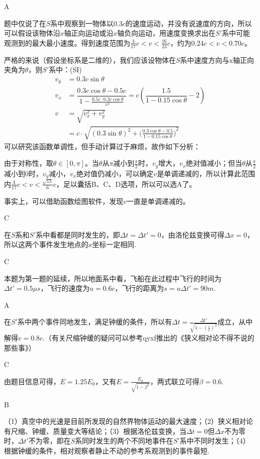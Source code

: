 \documentclass[b5paper,opensource,sourcefont,parskip]{qyxf-book}
\begin{document}
A

\solve
题中仅说了在$S$系中观察到一物体以$0.3c$的速度运动，并没有说速度的方向，所以可以假设该物体沿$x$轴正向运动或沿$x$轴负向运动，用速度变换求出在$S'$系中可能观测到的最大最小速度。得到速度范围为$\frac{4}{17}c<v<\frac{16}{23}c$，约为$0.24c<v<0.70c$。

严格的来说（假设坐标系是二维的），我们应该设物体在$S$系中速度方向与x轴正向夹角为$\theta$，则$S'$系中：(SI)
\begin{align*}
v_y&=0.3c\sin\theta\\
v_x&=\dfrac{0.3c\cos\theta-0.5c}{1-\frac{0.5c\cdot 0.3c\cos\theta}{c^2}}=c(\dfrac{1.5}{1-0.15\cos\theta}-2)\\
v&=\sqrt{v_x^2+v_y^2}\\
&=c\cdot \sqrt{(0.3\sin\theta)^2+{\big(\frac{0.3\cos\theta-0.5}{1-0.15\cos\theta}\big)}^2}
\end{align*}
可以研究该函数单调性，但手动计算过于麻烦，故作如下分析：

由于对称性，取$\theta\in[0,\pi]$。当$\theta$从$\pi$减小到$\frac{\pi}{2}$时，$v_y$增大，$v_x$绝对值减小；但当$\theta$从$\frac{\pi}{2}$减小到$0$时，$v_y$减小，$v_x$绝对值仍减小，可以确定$v$是单调递减的，所以计算此范围内$\frac{4}{17}c<v<\frac{\sqrt{13}}{6}c$，足以囊括B、C、D选项，所以可以选A了。

事实上，可以借助函数绘图软件，发现$v$一直是单调递减的。

C

\solve
在$S$系和$S'$系中看都是同时发生的，即$\Delta t=\Delta t'=0$，由洛伦兹变换可得$\Delta x=0$，所以这两个事件发生地点的$x$坐标一定相同.

C

\solve
本题为第一题的延续，所以地面系中看，飞船在此过程中飞行的时间为$\Delta t'=0.5\mu s$，飞行的速度为$u=0.6c$，飞行的距离为$s=u\Delta t'=90m$.

A

\solve
在$S'$系中两个事件同地发生，满足钟缓的条件，所以有$\Delta t=\frac{\Delta t'}{\sqrt{1-(\frac{v}{c})^2}}$成立，从中解得$v=0.8c$.（有关尺缩钟缓的疑问可以参考qyxf推出的《狭义相对论不得不说的那些事》）

C

\solve
由题目信息可得，$E=1.25E_0$，又有$E=\frac{E_0}{\sqrt{1-\beta^2}}$，两式联立可得$\beta=0.6$.

B

\solve
（1）真空中的光速是目前所发现的自然界物体运动的最大速度；（2）狭义相对论有尺缩、钟缓、质量变大等结论；（3）根据洛伦兹变换，当$\Delta t=0$但$\Delta x$不为零时，$\Delta t'$不为零，即在$S$系同时发生的两个不同地事件在$S'$系中不同时发生；（4）根据钟缓的条件，相对观察者静止不动的参考系观测到的事件最短.
\end{document}
